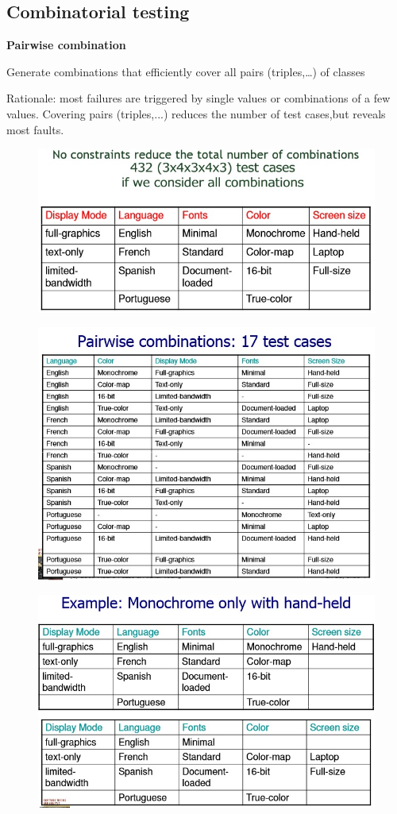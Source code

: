 \subsection{Combinatorial testing}
\textbf{Pairwise combination} 
\begin{itemize*}
	\item Generate combinations that efficiently cover all 	pairs (triples,…) of classes
	\item Rationale: most failures are triggered by single values or combinations of a few values. Covering pairs (triples,...) reduces the number of test cases,but reveals most faults.
\end{itemize*}

\begin{figure}[h!]
	\centering
	\includegraphics[width=0.7\linewidth]{../images/testingConstraint1.jpg}
	\caption{}
	\label{fig:testingC1}
\end{figure}
\begin{figure}[h!]
	\centering
	\includegraphics[width=0.7\linewidth]{../images/testingConstraint2.jpg}
	\caption{}
	\label{fig:testingC2}
\end{figure}
\begin{figure}[h!]
	\centering
	\includegraphics[width=0.7\linewidth]{../images/testingConstraint3.jpg}
	\caption{}
	\label{fig:testingC3}
\end{figure}

